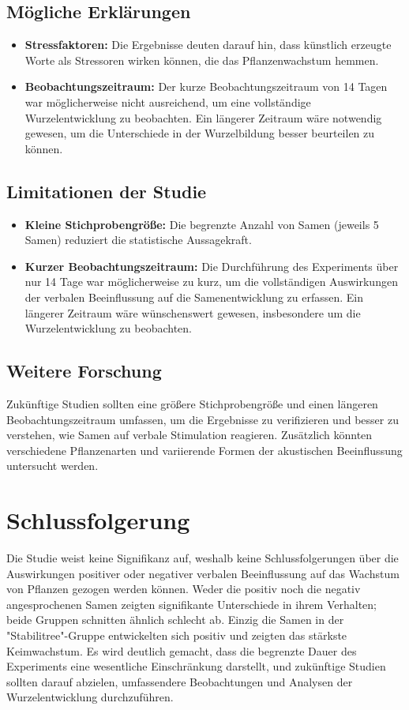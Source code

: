\subsection{Mögliche Erklärungen}
\begin{itemize}
    \item \textbf{Stressfaktoren:} Die Ergebnisse deuten darauf hin, dass künstlich erzeugte Worte als Stressoren wirken können, die das Pflanzenwachstum hemmen. 
    \item \textbf{Beobachtungszeitraum:} Der kurze Beobachtungszeitraum von 14 Tagen war möglicherweise nicht ausreichend, um eine vollständige Wurzelentwicklung zu beobachten. Ein längerer Zeitraum wäre notwendig gewesen, um die Unterschiede in der Wurzelbildung besser beurteilen zu können.
\end{itemize}

\subsection{Limitationen der Studie}
\begin{itemize}
    \item \textbf{Kleine Stichprobengröße:} Die begrenzte Anzahl von Samen (jeweils 5 Samen) reduziert die statistische Aussagekraft.
    \item \textbf{Kurzer Beobachtungszeitraum:} Die Durchführung des Experiments über nur 14 Tage war möglicherweise zu kurz, um die vollständigen Auswirkungen der verbalen Beeinflussung auf die Samenentwicklung zu erfassen. Ein längerer Zeitraum wäre wünschenswert gewesen, insbesondere um die Wurzelentwicklung zu beobachten.
\end{itemize}

\subsection{Weitere Forschung}
Zukünftige Studien sollten eine größere Stichprobengröße und einen längeren Beobachtungszeitraum umfassen, um die Ergebnisse zu verifizieren und besser zu verstehen, wie Samen auf verbale Stimulation reagieren. Zusätzlich könnten verschiedene Pflanzenarten und variierende Formen der akustischen Beeinflussung untersucht werden.

\pagebreak

\section{Schlussfolgerung}
Die Studie weist keine Signifikanz auf, weshalb keine Schlussfolgerungen über die Auswirkungen positiver oder negativer verbalen Beeinflussung auf das Wachstum von Pflanzen gezogen werden können. Weder die positiv noch die negativ angesprochenen Samen zeigten signifikante Unterschiede in ihrem Verhalten; beide Gruppen schnitten ähnlich schlecht ab. Einzig die Samen in der "Stabilitree"-Gruppe entwickelten sich positiv und zeigten das stärkste Keimwachstum.  Es wird deutlich gemacht, dass die begrenzte Dauer des Experiments eine wesentliche Einschränkung darstellt, und zukünftige Studien sollten darauf abzielen, umfassendere Beobachtungen und Analysen der Wurzelentwicklung durchzuführen.

